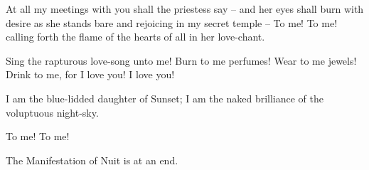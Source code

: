 At all my meetings with you shall the priestess say -- and her eyes shall burn with desire as she stands bare and rejoicing in my secret temple -- To me! To me! calling forth the flame of the hearts of all in her love-chant.

Sing the rapturous love-song unto me! Burn to me perfumes! Wear to me jewels! Drink to me, for I love you! I love you!

I am the blue-lidded daughter of Sunset; I am the naked brilliance of the voluptuous night-sky.

To me! To me!

The Manifestation of Nuit is at an end.
